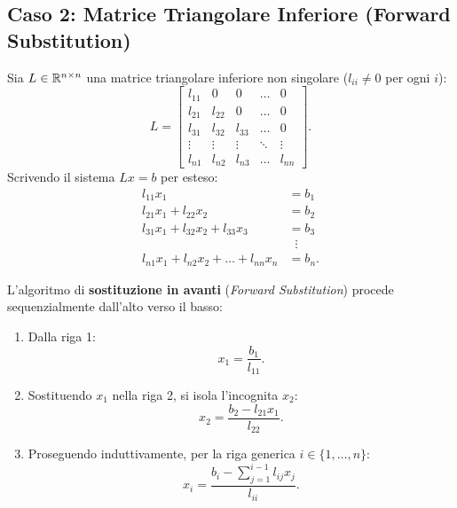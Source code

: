 \subsection{Caso 2: Matrice Triangolare Inferiore (Forward Substitution)}
Sia $L \in \mathbb{R}^{n \times n}$ una matrice triangolare inferiore non singolare ($l_{ii} \neq 0$ per ogni $i$):
\begin{equation}
    L = \begin{bmatrix}
        l_{11} & 0 & 0 & \dots & 0 \\
        l_{21} & l_{22} & 0 & \dots & 0 \\
        l_{31} & l_{32} & l_{33} & \dots & 0 \\
        \vdots & \vdots & \vdots & \ddots & \vdots \\
        l_{n1} & l_{n2} & l_{n3} & \dots & l_{nn}
    \end{bmatrix}.
\end{equation}
Scrivendo il sistema $Lx = b$ per esteso:
\begin{equation}
    \begin{aligned}
        l_{11} x_1 &= b_1 \\
        l_{21} x_1 + l_{22} x_2 &= b_2 \\
        l_{31} x_1 + l_{32} x_2 + l_{33} x_3 &= b_3 \\
        &\;\;\vdots \\
        l_{n1} x_1 + l_{n2} x_2 + \dots + l_{nn} x_n &= b_n.
    \end{aligned}
\end{equation}

L'algoritmo di \textbf{sostituzione in avanti} (\textit{Forward Substitution}) procede sequenzialmente dall'alto verso il basso:
\begin{enumerate}
    \item Dalla riga 1:
    \begin{equation}
        x_1 = \frac{b_1}{l_{11}}.
    \end{equation}
    \item Sostituendo $x_1$ nella riga 2, si isola l'incognita $x_2$:
    \begin{equation}
        x_2 = \frac{b_2 - l_{21}x_1}{l_{22}}.
    \end{equation}
    \item Proseguendo induttivamente, per la riga generica $i \in \{1, \dots, n\}$:
    \begin{equation}
        x_i = \frac{b_i - \sum_{j=1}^{i-1} l_{ij} x_j}{l_{ii}}.
        \label{eq:formula-forward-sub}
    \end{equation}
\end{enumerate}

